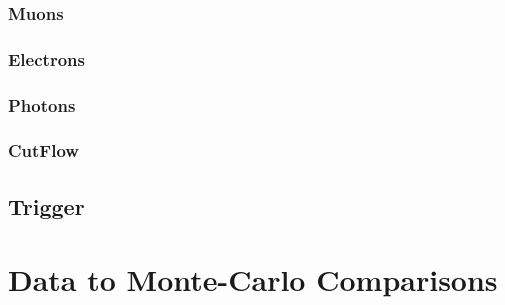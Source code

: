\subsubsection{Muons}
\subsubsection{Electrons}
\subsubsection{Photons}
\subsubsection{CutFlow}


\subsection{Trigger}


\section{Data to Monte-Carlo Comparisons }




